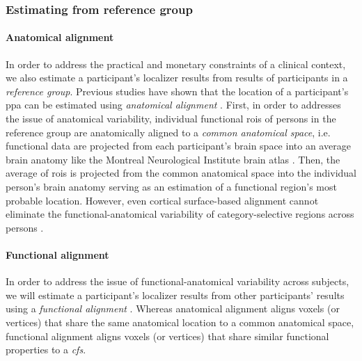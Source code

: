 \subsubsection{Estimating from reference group}






\paragraph{Anatomical alignment}
In order to address the practical and monetary constraints of a clinical
context, we also estimate a participant's localizer results from results of
participants in a \textit{reference group}.
Previous studies have shown that the location of a participant's \ac{ppa} can be
estimated using \textit{anatomical alignment} \citep{frost2012measuring,
rosenke2021probabilistic, weiner2018defining, zhen2017quantifying}.
%
First, in order to addresses the issue of anatomical variability, individual
functional \acp{roi} of persons in the reference group are anatomically aligned
to a \textit{common anatomical space}, i.e. functional data are projected from
each participant's brain space into an average brain anatomy like the Montreal
Neurological Institute brain atlas \citep[MNI152][]{fonov2011unbiased}.
%
Then, the average of \acp{roi} is projected from the common anatomical space
into the individual person's brain anatomy serving as an estimation of a
functional region's most probable location.
%
However, even cortical surface-based alignment \citep{fischl1999cortical,
yeo2009spherical} cannot eliminate the functional-anatomical variability of
category-selective regions across persons \citep{frost2012measuring,
weiner2018defining, weiner2014mid}.


\paragraph{Functional alignment}


In order to address the issue of functional-anatomical variability across
subjects, we will estimate a participant's localizer results from other
participants' results using a \textit{functional alignment} \citep[cf.][for
reviews]{haxby2020hyperalignment, bazeille2021empirical}.
%
Whereas anatomical alignment aligns voxels (or vertices) that share the same
anatomical location to a common anatomical space, functional alignment aligns
voxels (or vertices) that share similar functional properties to a
\textit{\ac{cfs}}.


